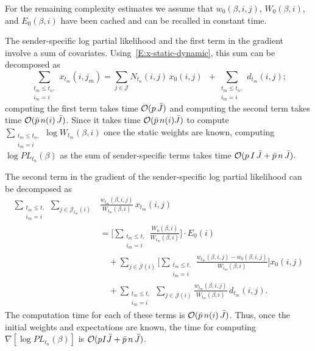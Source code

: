 \documentclass[final]{statsoc}
\begin{document}
For the remaining complexity estimates we assume that $w_0(\beta, i,j)$,
$W_0(\beta, i)$, and $E_0(\beta, i)$ have been cached and can be recalled
in constant time.

The sender-specific log partial likelihood and the first term in the gradient
involve a sum of covariates.  Using~\eqref{E:x-static-dynamic}, this sum can
be decomposed as
\[
    \sum_{\substack{t_m \leq t_n, \\ i_m = i}}
        x_{t_m}\!(i,j_m)
        =
            \sum_{j \in \mathcal{J}}
                N_{t_n}\!(i,j) \, x_0(i,j)
            \,\,\,
            +
            \sum_{\substack{t_m \leq t_n, \\ i_m = i}}
                d_{t_m}\!(i,j);
\]
computing the first term takes time $\mathcal{O}(p \, \bar J)$ and computing the second
term takes time $\mathcal{O}(\bar p \, n(i) \, \bar J)$.  Since it takes time
$\mathcal{O}(\bar p \, n(i) \bar J)$
to compute
\(
    \sum_{\substack{t_m \leq t_n, \\ i_m = i}}
        \log W_{t_m}\!(\beta, i)
\)
once the static weights are known, computing $\log \mathit{PL}_{t_n}(\beta)$
as the sum of sender-specific terms takes time
\(
    \mathcal{O}(p \, I \, \bar J + \bar p \, n \, \bar J).
\)

The second term in the gradient of the sender-specific log partial likelihood
can be decomposed as
\begin{align*}
    \sum_{\substack{t_m \leq t, \\ i_m = i}}
    \sum_{j \in \mathcal{J}_{t_m}\!(i)}\!\!
        &\frac{w_{t_m}\!(\beta,i,j)}{W_{t_m}\!(\beta,i)}
        \,
        x_{t_m}\!(i,j) \\
    &=
        \bigg[
        \sum_{\substack{t_m \leq t, \\ i_m = i}}
            \frac{
                W_{0}(\beta,i)
            }{
                W_{t_m}\!(\beta,i)
            }
        \bigg]
        \cdot
        E_0(i) \\
    &\quad+
        \sum_{j \in \mathcal{\bar J}(i)}
            \bigg[
                \sum_{\substack{t_m \leq t, \\ i_m = i}}
                    \frac{
                        w_{t_m}\!(\beta,i,j)
                        -
                        w_{0}(\beta,i,j)
                    }{
                        W_{t_m}\!(\beta,i)
                    }
            \bigg]
            x_0(i,j) \\
    &\quad+
        \sum_{\substack{t_m \leq t, \\ i_m = i}}
            \sum_{j \in \mathcal{\bar J}(i)}
                \frac{w_{t_m}\!(\beta,i,j)}{W_{t_m}\!(\beta,i)}
                \,
                d_{t_m}\!(i,j).
\end{align*}
The computation time for each of these terms is
$\mathcal{O}(\bar p \, n(i) \, \bar J)$.  Thus, once the initial weights and
expectations are known, the time for computing
$\nabla [ \log \mathit{PL}_{t_n}\!(\beta) ]$ is
$\mathcal{O}(p I \bar J + \bar p \, n \, \bar J)$.
\end{document}
